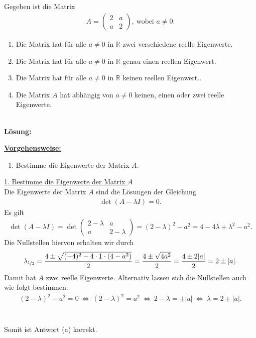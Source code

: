 \subsection*{}
Gegeben ist die Matrix
\begin{align*}
A = 
\begin{pmatrix}
2 & a\\
a & 2
\end{pmatrix},
\ \textrm{wobei } a\neq 0.
\end{align*}
\renewcommand{\labelenumi}{(\alph{enumi})}
\begin{enumerate}
\item 
Die Matrix hat für alle $ a \neq 0 $ in $ \mathbb{R} $ zwei verschiedene reelle Eigenwerte.
\item
Die Matrix hat für alle $ a \neq 0 $ in $ \mathbb{R} $ genau einen reellen Eigenwert.

\item
Die Matrix hat für alle $ a \neq 0 $ in $ \mathbb{R} $ keinen reellen Eigenwert..
\item
Die Matrix $ A $ hat abhängig von $ a \neq 0 $ keinen, einen oder zwei reelle Eigenwerte.
\end{enumerate}
\ \\
\textbf{Lösung:}
\begin{mdframed}
\underline{\textbf{Vorgehensweise:}}
\renewcommand{\labelenumi}{\theenumi.}
\begin{enumerate}
\item Bestimme die Eigenwerte der Matrix $ A $.
\end{enumerate}
\end{mdframed}

\underline{1. Bestimme die Eigenwerte der Matrix $ A $}\\
Die Eigenwerte der Matrix $ A $ sind die Lösungen der Gleichung
\begin{align*}
\det(A - \lambda I) = 0.
\end{align*}
Es gilt
\begin{align*}
\det(A - \lambda I)=
\det
\begin{pmatrix}
2- \lambda & a \\
a & 2 - \lambda
\end{pmatrix}
= (2- \lambda)^2 - a^2
= 4 - 4 \lambda + \lambda^2 - a^2.
\end{align*}
Die Nullstellen hiervon erhalten wir durch
\begin{align*}
\lambda_{\nicefrac{1}{2}}
=
\frac{4 \pm \sqrt{(-4)^2 - 4 \cdot 1 \cdot (4 - a^2)}}{2}
=
\frac{4 \pm \sqrt{4 a^2}}{2}
=
\frac{4 \pm 2 |a|}{2}
=
2 \pm |a|.
\end{align*}
Damit hat $ A $ zwei reelle Eigenwerte.
Alternativ lassen sich die Nullstellen auch wie folgt bestimmen:
\begin{align*}
(2- \lambda)^2 - a^2 = 0 
\ \Leftrightarrow \
(2- \lambda)^2 = a^2 
\ \Leftrightarrow \
2 - \lambda = \pm|a|
\ \Leftrightarrow \
\lambda = 2 \pm |a|.
\end{align*}
\\
\\
Somit ist Antwort (a) korrekt.

\newpage